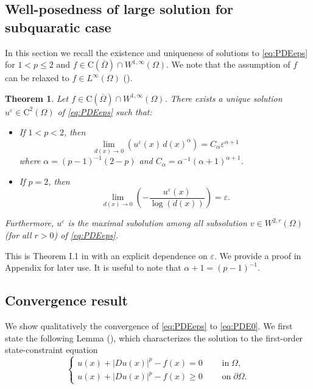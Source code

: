 \documentclass[11pt,reqno]{amsart}
\numberwithin{figure}{section}
\theoremstyle{plain}
\newtheorem{thm}{Theorem}[section]
\theoremstyle{remark}
\numberwithin{equation}{section}
\begin{document}
\subsection{Well-posedness of large solution for subquaratic case} In this section we recall the existence and uniqueness of solutions to \eqref{eq:PDEeps} for $1<p\leq 2$ and $f\in \mathrm{C}(\overline{\Omega})\cap W^{1,\infty}(\Omega)$. We note that the assumption of $f$ can be relaxed to $f\in L^\infty(\Omega)$ (\cite{Lasry1989}).

\begin{thm}\label{thm:wellposed1<p<2} Let $f\in \mathrm{C}(\overline{\Omega})\cap W^{1,\infty}(\Omega)$. There exists a unique solution $u^\varepsilon\in \mathrm{C}^2(\Omega)$ of \eqref{eq:PDEeps} such that:
\begin{itemize}
    \item[(i)] If $1<p< 2$, then 
\begin{equation}\label{rate_p<2}
    \lim_{d(x)\to 0}\left( u^\varepsilon(x) \,d(x)^\alpha \right)= C_\alpha \varepsilon^{\alpha+1}
\end{equation}
where $\alpha = (p-1)^{-1}(2-p)$ and $C_\alpha = \alpha^{-1}(\alpha+1)^{\alpha+1}$.
\item[(ii)] If $p=2$, then
\begin{equation}\label{rate_p=2}
    \lim_{d(x)\to 0} \left(-\frac{u^\varepsilon(x)}{\log(d(x))}\right) = \varepsilon.
\end{equation}
\end{itemize}
Furthermore, $u^\varepsilon$ is the maximal subolution among all subsolution $v\in W^{2,r}(\Omega)$ (for all $r>0$) of \eqref{eq:PDEeps}.
\end{thm}
\noindent This is Theorem I.1 in \cite{Lasry1989} with an explicit dependence on $\varepsilon$. We provide a proof in Appendix for later use. It is useful to note that $\alpha+1 = (p-1)^{-1}$. 

\subsection{Convergence result} We show qualitatively the convergence of \eqref{eq:PDEeps} to \eqref{eq:PDE0}. We first state the following Lemma (\cite{Capuzzo-Dolcetta1990}), which characterizes the solution to the first-order state-constraint  equation
\begin{equation}\label{S_0}
\begin{cases}
       u(x) + |Du(x)|^p - f(x) = 0\;\qquad\text{in}\;\Omega,\\
       u(x) + |Du(x)|^p - f(x) \geq 0\;\qquad\text{on}\;\partial\Omega. 
\end{cases}\tag{$S_0$}   
\end{equation}
\end{document}
